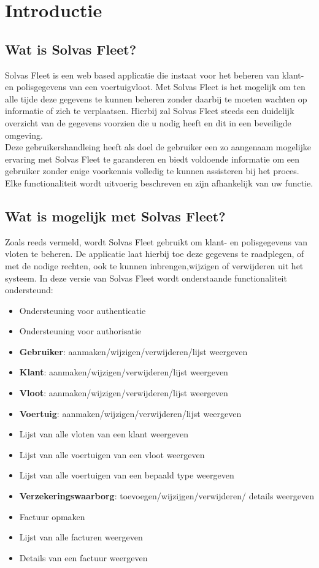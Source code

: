 \documentclass[11pt,openany]{article}
\begin{document}
	
	\tableofcontents
	\newpage
	
\section{Introductie}

\subsection{Wat is Solvas Fleet?}
Solvas Fleet is een web based applicatie die instaat voor het beheren van klant- en polisgegevens van een voertuigvloot. Met Solvas Fleet is het mogelijk om ten alle tijde deze gegevens te kunnen beheren zonder daarbij te moeten wachten op informatie of zich te verplaatsen.  Hierbij zal Solvas Fleet steeds een duidelijk overzicht van de gegevens voorzien die u nodig heeft en dit in een beveiligde omgeving.\\

Deze gebruikershandleing heeft als doel de gebruiker een zo aangenaam mogelijke ervaring met Solvas Fleet te garanderen en biedt voldoende informatie om een gebruiker zonder enige voorkennis volledig te kunnen assisteren bij het proces. \\

Elke functionaliteit wordt uitvoerig beschreven en zijn afhankelijk van uw functie.

\subsection{Wat is mogelijk met Solvas Fleet?}
Zoals reeds vermeld, wordt Solvas Fleet gebruikt om klant- en polisgegevens van vloten te beheren. De applicatie laat hierbij toe deze gegevens te raadplegen, of met de nodige rechten, ook te kunnen inbrengen,wijzigen of verwijderen uit het systeem. In deze versie van Solvas Fleet wordt onderstaande functionaliteit ondersteund:


\begin{itemize}[noitemsep]
	\item Ondersteuning voor authenticatie
	\item Ondersteuning voor authorisatie
	\item \textbf{Gebruiker}: aanmaken/wijzigen/verwijderen/lijst weergeven
	\item \textbf{Klant}: aanmaken/wijzigen/verwijderen/lijst weergeven
	\item \textbf{Vloot}: aanmaken/wijzigen/verwijderen/lijst weergeven
	\item \textbf{Voertuig}: aanmaken/wijzigen/verwijderen/lijst weergeven
	\item Lijst van alle vloten van een klant weergeven
	\item Lijst van alle voertuigen van een vloot weergeven
	\item Lijst van alle voertuigen van een bepaald type weergeven
	\item \textbf{Verzekeringswaarborg}: toevoegen/wijzijgen/verwijderen/ details weergeven
	\item Factuur opmaken
	\item Lijst van alle facturen weergeven
	\item Details van een factuur weergeven
\end{itemize}
\newpage
\end{document}
